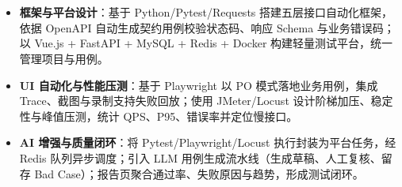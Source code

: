 \documentclass[10pt]{article}
\begin{document}
    \vspace{0.25em}



    \section[项目经历]{}

    \begin{itemize}
        \item \textbf{框架与平台设计}：基于 Python/Pytest/Requests 搭建五层接口自动化框架，依据 OpenAPI 自动生成契约用例校验状态码、响应 Schema 与业务错误码；以 Vue.js + FastAPI + MySQL + Redis + Docker 构建轻量测试平台，统一管理项目与用例。
        \item \textbf{UI 自动化与性能压测}：基于 Playwright 以 PO 模式落地业务用例，集成 Trace、截图与录制支持失败回放；使用 JMeter/Locust 设计阶梯加压、稳定性与峰值压测，统计 QPS、P95、错误率并定位慢接口。
        \item \textbf{AI 增强与质量闭环}：将 Pytest/Playwright/Locust 执行封装为平台任务，经 Redis 队列异步调度；引入 LLM 用例生成流水线（生成草稿、人工复核、留存 Bad Case）；报告页聚合通过率、失败原因与趋势，形成测试闭环。
    \end{itemize}
\end{document}

